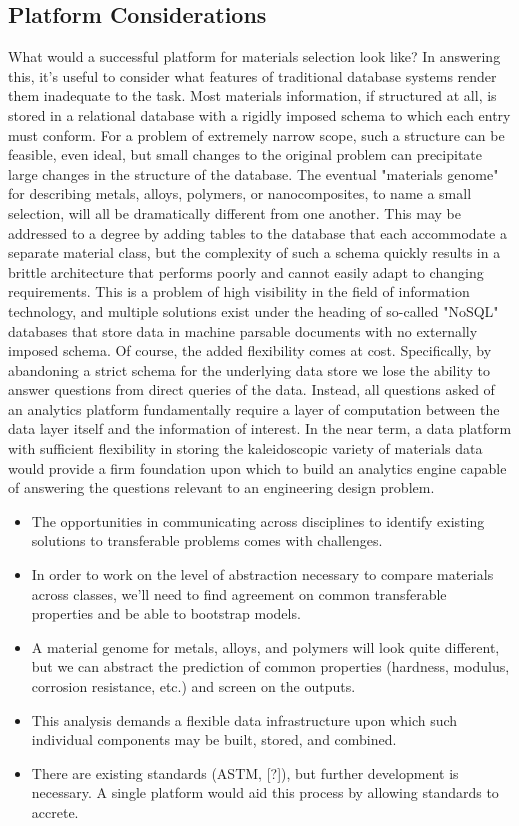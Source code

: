 \subsection{Platform Considerations}

What would a successful platform for materials selection look like? 
In answering this, it's useful to consider what features of traditional database systems render them inadequate to the task. 
Most materials information, if structured at all, is stored in a relational database with a rigidly imposed schema to which each entry must conform.
For a problem of extremely narrow scope, such a structure can be feasible, even ideal, but small changes to the original problem can precipitate large changes in the structure of the database.
The eventual "materials genome" for describing metals, alloys, polymers, or nanocomposites, to name a small selection, will all be dramatically different from one another. 
This may be addressed to a degree by adding tables to the database that each accommodate a separate material class, but the complexity of such a schema quickly results in a brittle architecture that performs poorly and cannot easily adapt to changing requirements. 
This is a problem of high visibility in the field of information technology, and multiple solutions exist under the heading of so-called "NoSQL" databases that store data in machine parsable documents with no externally imposed schema\cite{Han2011,Kaur2013}.
Of course, the added flexibility comes at cost. Specifically, by abandoning a strict schema for the underlying data store we lose the ability to answer questions from direct queries of the data. 
Instead, all questions asked of an analytics platform fundamentally require a layer of computation between the data layer itself and the information of interest.  
In the near term, a data platform with sufficient flexibility in storing the kaleidoscopic variety of materials data would provide a firm foundation upon which to build an analytics engine capable of answering the questions relevant to an engineering design problem.

\begin{itemize}
\item The opportunities in communicating across disciplines to identify existing solutions to transferable problems comes with challenges.
\item In order to work on the level of abstraction necessary to compare materials across classes, we’ll need to find agreement on common transferable properties and be able to bootstrap models.
\item A material genome for metals, alloys, and polymers will look quite different, but we can abstract the prediction of common properties (hardness, modulus, corrosion resistance, etc.) and screen on the outputs. 
\item This analysis demands a flexible data infrastructure upon which such individual components may be built, stored, and combined.
\item There are existing standards (ASTM, [?]), but further development is necessary. A single platform would aid this process by allowing standards to accrete.

\end{itemize}
